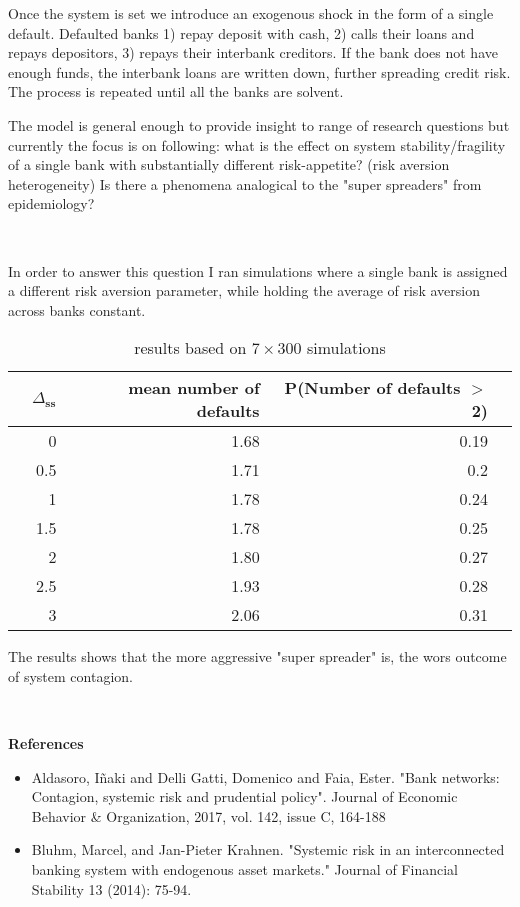 \documentclass{article}
\begin{document}
Once the system is set we introduce an exogenous shock in the form of a single default. Defaulted banks 1) repay deposit with cash, 2) calls their loans and repays depositors, 3) repays their interbank creditors. If the bank does not have enough funds, the interbank loans are written down, further spreading credit risk. The process is repeated until all the banks are solvent.

The model is general enough to provide insight to range of research questions but currently the focus is on following: what is the effect on system stability/fragility of a single bank with substantially different risk-appetite? (risk aversion heterogeneity) Is there a phenomena analogical to the "super spreaders" from epidemiology?

\

In order to answer this question I ran simulations where a single bank is assigned a different risk aversion parameter, while holding the average of risk aversion across banks constant.

\begin{table}[ht]
    \centering
    \begin{tabular}{rrrrr}
      \hline
     & $\Delta_{\textbf{ss}}$ & mean number of defaults &  P(Number of defaults $>$ 2) \\ 
      \hline
   & 0 & 1.68 & 0.19\\ 
   & 0.5 & 1.71 & 0.2\\ 
   & 1 & 1.78 & 0.24\\ 
   & 1.5 & 1.78 & 0.25\\ 
   & 2 & 1.80 & 0.27 \\ 
   & 2.5 & 1.93 & 0.28\\ 
   & 3 & 2.06 & 0.31\\ 
       \hline
    \end{tabular}
    \caption{results based on $7 \times 300$ simulations}
\end{table}

The results shows that the more aggressive "super spreader" is, the wors outcome of system contagion. 

\

\textbf{References}

\begin{itemize}
    \item  Aldasoro, Iñaki and Delli Gatti, Domenico and Faia, Ester. "Bank networks: Contagion, systemic risk and prudential policy". Journal of Economic Behavior \& Organization, 2017, vol. 142, issue C, 164-188
    \item Bluhm, Marcel, and Jan-Pieter Krahnen. "Systemic risk in an interconnected banking system with endogenous asset markets." Journal of Financial Stability 13 (2014): 75-94.
\end{itemize}
\end{document}
